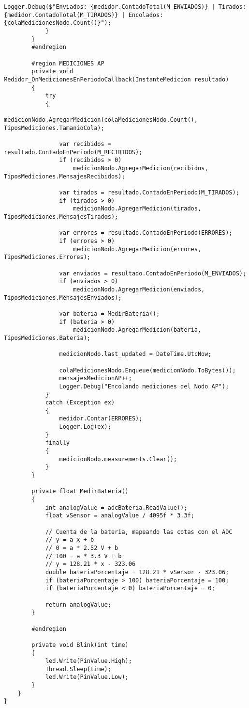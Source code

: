\begin{lstlisting}[caption={Ejemplo de código en C\#}]
                Logger.Debug($"Enviados: {medidor.ContadoTotal(M_ENVIADOS)} | Tirados: {medidor.ContadoTotal(M_TIRADOS)} | Encolados: {colaMedicionesNodo.Count()}");
            }
        }
        #endregion

        #region MEDICIONES AP
        private void Medidor_OnMedicionesEnPeriodoCallback(InstanteMedicion resultado)
        {
            try
            {
                medicionNodo.AgregarMedicion(colaMedicionesNodo.Count(), TiposMediciones.TamanioCola);

                var recibidos = resultado.ContadoEnPeriodo(M_RECIBIDOS);
                if (recibidos > 0)
                    medicionNodo.AgregarMedicion(recibidos, TiposMediciones.MensajesRecibidos);

                var tirados = resultado.ContadoEnPeriodo(M_TIRADOS);
                if (tirados > 0)
                    medicionNodo.AgregarMedicion(tirados, TiposMediciones.MensajesTirados);

                var errores = resultado.ContadoEnPeriodo(ERRORES);
                if (errores > 0)
                    medicionNodo.AgregarMedicion(errores, TiposMediciones.Errores);

                var enviados = resultado.ContadoEnPeriodo(M_ENVIADOS);
                if (enviados > 0)
                    medicionNodo.AgregarMedicion(enviados, TiposMediciones.MensajesEnviados);

                var bateria = MedirBateria();
                if (bateria > 0)
                    medicionNodo.AgregarMedicion(bateria, TiposMediciones.Bateria);

                medicionNodo.last_updated = DateTime.UtcNow;

                colaMedicionesNodo.Enqueue(medicionNodo.ToBytes());
                mensajesMedicionAP++;
                Logger.Debug("Encolando mediciones del Nodo AP");
            }
            catch (Exception ex)
            {
                medidor.Contar(ERRORES);
                Logger.Log(ex);
            }
            finally
            {
                medicionNodo.measurements.Clear();
            }
        }

        private float MedirBateria()
        {
            int analogValue = adcBateria.ReadValue();
            float vSensor = analogValue / 4095f * 3.3f;

            // Cuenta de la bateria, mapeando las cotas con el ADC
            // y = a x + b
            // 0 = a * 2.52 V + b
            // 100 = a * 3.3 V + b
            // y = 128.21 * x - 323.06
            double bateriaPorcentaje = 128.21 * vSensor - 323.06;
            if (bateriaPorcentaje > 100) bateriaPorcentaje = 100;
            if (bateriaPorcentaje < 0) bateriaPorcentaje = 0;

            return analogValue;
        }

        #endregion

        private void Blink(int time)
        {
            led.Write(PinValue.High);
            Thread.Sleep(time);
            led.Write(PinValue.Low);
        }
    }
}

\end{lstlisting}
